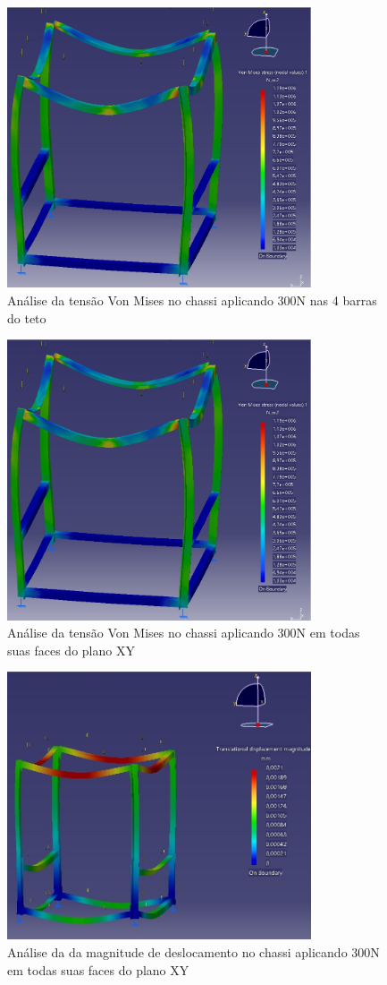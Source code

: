 \begin{figure}[H]
	\centering
	\includegraphics[width=9cm]{figuras/catia_6.jpg}
	\caption{Análise da tensão Von Mises no chassi aplicando 300N nas 4 barras do teto} 
	\label{catia_6}
\end{figure}

\begin{figure}[H]
	\centering
	\includegraphics[width=9cm]{figuras/catia_7.jpg}
	\caption{Análise da tensão Von Mises no chassi aplicando 300N em todas suas faces do plano XY} 
	\label{catia_7}
\end{figure}

\begin{figure}[H]
	\centering
	\includegraphics[width=9cm]{figuras/catia_8.jpg}
	\caption{Análise da da magnitude de deslocamento no chassi aplicando 300N em todas suas faces do plano XY} 
	\label{catia_8}
\end{figure}

